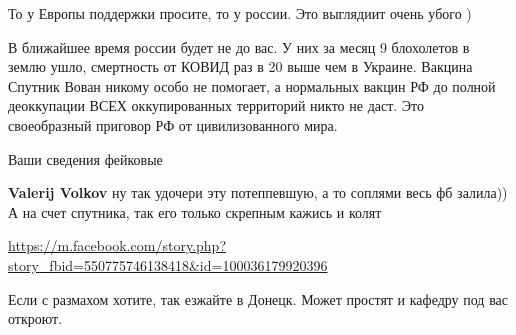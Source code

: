 \begin{itemize}
То у Европы поддержки просите, то у россии. Это выглядиит очень убого )

В ближайшее время россии будет не до вас. У них за месяц 9 блохолетов в землю
ушло, смертность от КОВИД раз в 20 выше чем в Украине. Вакцина Спутник Вован
никому особо не помогает, а нормальных вакцин РФ до полной деоккупации ВСЕХ
оккупированных территорий никто не даст. Это своеобразный приговор РФ от
цивилизованного мира.

\begin{itemize}
 
Ваши сведения фейковые

 
\textbf{Valerij Volkov} ну так удочери эту потеппевшую, а то соплями весь фб залила))
А на счет спутника, так его только скрепным кажись и колят🤣

 
\url{https://m.facebook.com/story.php?story_fbid=550775746138418&id=100036179920396}
\end{itemize}

 
Если с размахом хотите, так езжайте в Донецк. Может простят и кафедру под вас
откроют.

\begin{itemize}
 

\end{itemize}
\end{itemize}
